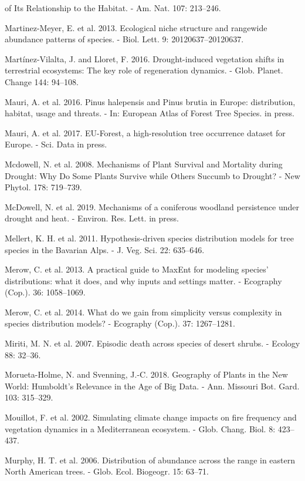 \documentclass[11pt,twoside]{reedthesis}
\begin{document}
of Its Relationship to the Habitat. - Am. Nat. 107: 213--246.\par
Martinez-Meyer, E. et al. 2013. Ecological niche structure and rangewide
abundance patterns of species. - Biol. Lett. 9: 20120637--20120637.\par
Martínez-Vilalta, J. and Lloret, F. 2016. Drought-induced vegetation
shifts in terrestrial ecosystems: The key role of regeneration dynamics.
- Glob. Planet. Change 144: 94--108.\par
Mauri, A. et al. 2016. Pinus halepensis and Pinus brutia in Europe:
distribution, habitat, usage and threats. - In: European Atlas of Forest
Tree Species. in press.\par
Mauri, A. et al. 2017. EU-Forest, a high-resolution tree occurrence
dataset for Europe. - Sci. Data in press.\par
Mcdowell, N. et al. 2008. Mechanisms of Plant Survival and Mortality
during Drought: Why Do Some Plants Survive while Others Succumb to
Drought? - New Phytol. 178: 719--739.\par
McDowell, N. et al. 2019. Mechanisms of a coniferous woodland
persistence under drought and heat. - Environ. Res. Lett. in press.\par
Mellert, K. H. et al. 2011. Hypothesis-driven species distribution
models for tree species in the Bavarian Alps. - J. Veg. Sci. 22:
635--646.\par
Merow, C. et al. 2013. A practical guide to MaxEnt for modeling species'
distributions: what it does, and why inputs and settings matter. -
Ecography (Cop.). 36: 1058--1069.\par
Merow, C. et al. 2014. What do we gain from simplicity versus complexity
in species distribution models? - Ecography (Cop.). 37: 1267--1281.\par
Miriti, M. N. et al. 2007. Episodic death across species of desert
shrubs. - Ecology 88: 32--36.\par
Morueta-Holme, N. and Svenning, J.-C. 2018. Geography of Plants in the
New World: Humboldt's Relevance in the Age of Big Data. - Ann. Missouri
Bot. Gard. 103: 315--329.\par
Mouillot, F. et al. 2002. Simulating climate change impacts on fire
frequency and vegetation dynamics in a Mediterranean ecosystem. - Glob.
Chang. Biol. 8: 423--437.\par
Murphy, H. T. et al. 2006. Distribution of abundance across the range in
eastern North American trees. - Glob. Ecol. Biogeogr. 15: 63--71.\par
\end{document}
